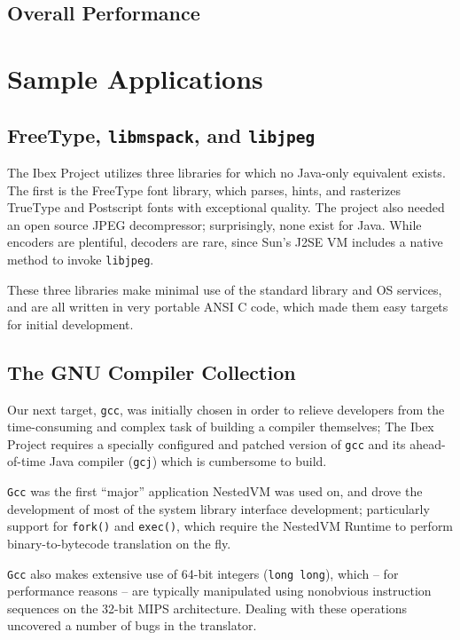 \documentclass{acmconf}
\begin{document}
\subsection{Overall Performance}




\section{Sample Applications}

\subsection{FreeType, {\tt libmspack}, and {\tt libjpeg}}

The Ibex Project utilizes three libraries for which no Java-only
equivalent exists.  The first is the FreeType font library, which
parses, hints, and rasterizes TrueType and Postscript fonts with
exceptional quality.  The project also needed an open source JPEG
decompressor; surprisingly, none exist for Java.  While encoders are
plentiful, decoders are rare, since Sun's J2SE VM includes a native
method to invoke {\tt libjpeg}.

These three libraries make minimal use of the standard library and OS
services, and are all written in very portable ANSI C code, which made
them easy targets for initial development.

\subsection{The GNU Compiler Collection}

Our next target, {\tt gcc}, was initially chosen in order to relieve
developers from the time-consuming and complex task of building a
compiler themselves; The Ibex Project requires a specially configured
and patched version of {\tt gcc} and its ahead-of-time Java compiler
({\tt gcj}) which is cumbersome to build.

{\tt Gcc} was the first ``major'' application NestedVM was used on,
and drove the development of most of the system library interface
development; particularly support for {\tt fork()} and {\tt exec()},
which require the NestedVM Runtime to perform binary-to-bytecode
translation on the fly.

{\tt Gcc} also makes extensive use of 64-bit integers ({\tt long
long}), which -- for performance reasons -- are typically manipulated
using nonobvious instruction sequences on the 32-bit MIPS
architecture.  Dealing with these operations uncovered a number of
bugs in the translator.
\end{document}
